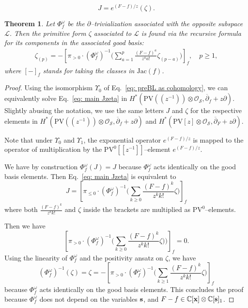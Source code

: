 \documentclass[10pt,a4paper]{amsart}
\newtheorem{theorem}{Theorem}
\newcommand{\CC}{{\mathbb{C}}}
\newcommand{\Jac}{\mathrm{Jac}}
\def\L{{\mathcal L}}
\def\O{{\mathcal O}}
\newcommand{\PV}{{\mathrm{PV}}}
\renewcommand{\S}{{\mathcal S}}
\newcommand{\bs}{{\bf s}}
\newcommand{\bx}{{\bf x}}
\newcommand{\p}{{\partial}}
\begin{document}
    \begin{equation}\label{eq: main Jzeta}
        J = e^{(F-f)/z}(\zeta).
    \end{equation}

\begin{theorem}\label{theorem: primitive form}
Let $\Phi_f^\omega$ be the $\p$--trivialization associated with the opposite subspace $\L$.
Then the primitive form $\zeta$ associated to $\L$ is found via the recursive formula for its components in the associated good basis:
\begin{align}
    \zeta_{(p)} = - \left[ \pi_{>0} \cdot (\Phi_f^\omega)^{-1} \Big( \sum_{a=1}^p \frac{(F-f)^a}{z^a a!} \zeta_{(p-a)}  \Big) \right]_f, \quad p \ge 1,
\end{align}
where $[-]_f$ stands for taking the classes in $\Jac(f)$.
\end{theorem}

\begin{proof}
    Using the isomorphism $\Upsilon_0$ of Eq.~\ref{eq: preBL as cohomology}, we can equivalently solve Eq.~\eqref{eq: main Jzeta} in $H^\ast(\PV((z^{-1})) \otimes \O_\S,\overline\p_f + z\p)$.
    Slightly abusing the notation, we use the same letters $J$ and $\zeta$ for the respective elements in $H^\ast(\PV((z^{-1})) \otimes \O_\S,\overline\p_f + z\p)$ and $H^\ast(\PV [z] \otimes \O_\S,\overline\p_F + z\p)$.

    Note that under $\Upsilon_0$ and $\Upsilon_1$, the exponential operator $e^{(F-f)/z}$ is mapped to the operator of multiplication by the $\PV^0[[z^{-1}]]$--element $e^{(F-f)/z}$.

    We have by construction $\Phi_f^\omega(J) = J$ because $\Phi_f^\omega$ acts identically on the good basis elements.
    Then Eq.~\eqref{eq: main Jzeta} is equivalent to
    \[
        J = \left[ \pi_{\le 0} \cdot (\Phi_f^\omega)^{-1} \Big( \sum_{k \ge 0} \frac{(F-f)^k}{z^k k!} \zeta \Big)  \right]_f
    \]
    where both $\frac{(F-f)^k}{z^k k!}$ and $\zeta$ inside the brackets are multiplied as $\PV^0$--elements.

    Then we have
    \[
        \left[ \pi_{> 0} \cdot (\Phi_f^\omega)^{-1} \Big( \sum_{k \ge 0} \frac{(F-f)^k}{z^k k!} \zeta \Big) ) \right]_f = 0.
    \]
    Using the linearity of $\Phi_f^\omega$ and the positivity ansatz on $\zeta$, we have
    \[
        (\Phi_f^\omega)^{-1} (\zeta) = \zeta = - \left[ \pi_{>0} \cdot (\Phi_f^\omega)^{-1} \Big( \sum_{k \ge 1} \frac{(F-f)^k}{z^k k!} \zeta \Big) \right]_f
    \]
    because $\Phi_f^\omega$ acts identically on the good basis elements. This concludes the proof because $\Phi_f^\omega$ does not depend on the variables $\bs$, and $F-f \in \CC[\bx] \otimes \CC[\bs]_1$.
\end{proof}
\end{document}
